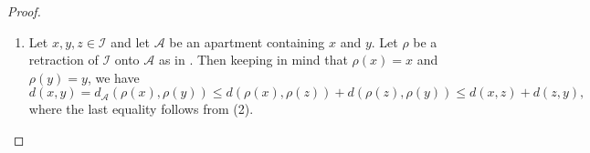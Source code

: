 \documentclass{article}
\theoremstyle{thmstyle}
\newtheorem{proposition}[theorem]{Proposition}
\theoremstyle{defstyle}
\newcommand{\scrA}{\mathscr{A}}
\newcommand{\scrI}{\mathscr{I}}
\renewcommand{\le}{\leqslant}
\begin{document}
\begin{proof}
\begin{enumerate}[label=(\arabic*)]
\item Let $x, y, z\in\scrI$ and let $\scrA$ be an apartment containing $x$ and $y$. Let $\rho$ be a retraction of $\scrI$ onto $\scrA$ as in . Then keeping in mind that $\rho(x) = x$ and $\rho(y) = y$, we have 
\begin{equation*}
    d(x, y) = d_{\scrA}(\rho(x), \rho(y))\le d(\rho(x), \rho(z)) + d(\rho(z), \rho(y))\le d(x, z) + d(z, y),
\end{equation*}
where the last equality follows from (2). \qedhere
\end{enumerate}
\end{proof}

\end{document}
